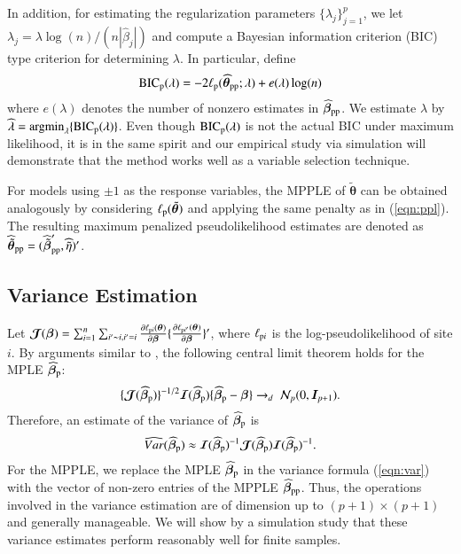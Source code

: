 \documentclass[authoryear,review, 12pt]{elsarticle}
\begin{document}
In addition, for estimating the regularization parameters $\{\lambda_j\}_{j=1}^p$, we let $\lambda_j=\lambda\log(n)/(n|\widehat{\beta}_j|)$ and compute a Bayesian information criterion (BIC) type criterion for determining $\lambda$.  In particular, define
\begin{eqnarray}
\mbox{BIC}_{\rm p}(\lambda)=-2\ell_{\rm p}(\widehat{\bm{\theta}}_{\rm pp};\lambda)+e(\lambda)\log(n)
\end{eqnarray}
where $e(\lambda)$ denotes the number of nonzero estimates in $\widehat{\bm{\beta}}_{\rm pp}$.  We estimate $\lambda$ by $\widehat\lambda=\mbox{argmin}_{\lambda}\{\mbox{BIC}_{\rm p}(\lambda)\}$.  Even though $\mbox{BIC}_{\rm p}(\lambda)$ is not the actual BIC under maximum likelihood, it is in the same spirit and our empirical study via simulation will demonstrate that the method works well as a variable selection technique.

For models using $\pm 1$ as the response variables, the MPPLE of $\tilde{\bm{\theta}}$ can be obtained analogously by considering $\ell_{\rm p}(\tilde{\bm{\theta}})$ and applying the same penalty as in (\ref{eqn:ppl}).  The resulting maximum penalized pseudolikelihood estimates are denoted as $\widehat{\tilde{\bm{\theta}}}_{\rm pp}=(\widehat{\tilde{\bm{\beta}}}_{\rm pp}',\widehat{\tilde{\eta}})'$.  

\subsection{Variance Estimation}
\label{subsec:infer:se}

Let $\bm{\mathcal{J}}(\bm{\beta})
=\sum_{i=1}^n\sum_{i'\thicksim i, i'=i}\frac{\partial\ell_{{\rm p}i}(\bm{\theta})}{\partial\bm{\beta}}\{\frac{\partial\ell_{{\rm p}i'}(\bm{\theta})}{\partial\bm{\beta}}\}'$, where $\ell_{{\rm p}i}$ is the log-pseudolikelihood of site $i$. 
By arguments similar to \cite{gaetang10}, the following central limit theorem holds for the MPLE $\widehat{\bm{\beta}}_{\rm p}$:
\begin{eqnarray}
\{\bm{\mathcal{J}}(\widehat{\bm{\beta}}_{\rm p})\}^{-1/2} \bm{\mathcal{I}}(\widehat{\bm{\beta}}_{\rm p})\{\widehat{\bm{\beta}}_{\rm p}-\bm{\beta}\} \rightarrow_d \ \mathcal{N}_p(0,\bm{I}_{p+1}).
\label{eqn:CLT}
\end{eqnarray}
Therefore, an estimate of the variance of $\bm{\widehat{\beta}}_{\rm p}$ is
\begin{eqnarray}
\widehat{Var}(\widehat{\bm{\beta}}_{\rm p})\approx\bm{\mathcal{I}}(\widehat{\bm{\beta}}_{\rm p})^{-1}\bm{\mathcal{J}}(\widehat{\bm{\beta}}_{\rm p})\bm{\mathcal{I}}(\widehat{\bm{\beta}}_{\rm p})^{-1}.
\label{eqn:var}
\end{eqnarray}  
For the MPPLE, we replace the MPLE $\widehat{\bm{\beta}}_{\rm p}$ in the variance formula (\ref{eqn:var}) with the vector of non-zero entries of the MPPLE $\widehat{\bm{\beta}}_{\rm pp}$. Thus, the operations involved in the variance estimation are of dimension up to $(p+1)\times(p+1)$ and generally manageable. We will show by a simulation study that these variance estimates perform reasonably well for finite samples.  
\end{document}
